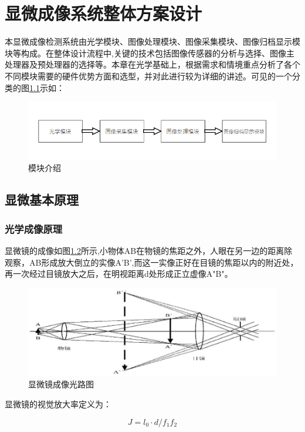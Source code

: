 \chapter{显微成像系统整体方案设计}
本显微成像检测系统由光学模块、图像处理模块、图像采集模块、图像归档显示模块等构成。在整体设计流程中,关键的技术包括图像传感器的分析与选择、图像主处理器及预处理器的选择等。本章在光学基础上，根据需求和情境重点分析了各个不同模块需要的硬件优势方面和选型，并对此进行较为详细的讲述。可见的一个分类的图\ref{fig:module_1}示如：
\begin{figure}[h]
\centering
\includegraphics[width=0.7\linewidth]{Figure/module_1}
\caption{模块介绍}
\label{fig:module_1}
\end{figure}


\section{显微基本原理}
\subsection{光学成像原理}

显微镜的成像如图\ref{fig:micro_1}所示,小物体AB在物镜的焦距之外，人眼在另一边的距离除观察，AB形成放大倒立的实像A'B',而这一实像正好在目镜的焦距以内的附近处，再一次经过目镜放大之后，在明视距离d处形成正立虚像A"B"\cite{lightxidian}。


\begin{figure}[h]
	\centering
	\includegraphics[width=0.7\linewidth]{Figure/micro_1}
	\caption[显微镜成像光路图]{显微镜成像光路图}
	\label{fig:micro_1}
\end{figure}

显微镜的视觉放大率定义为：

\begin{equation}
\label{j2}
J = l_{0}\cdot d / f_{1}f_{2}
\end{equation}


